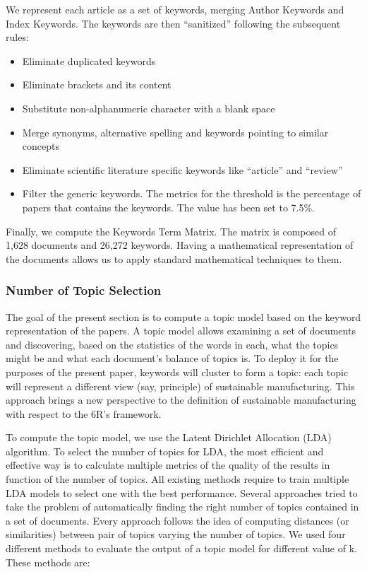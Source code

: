 \documentclass[b5paper,]{book}
\providecommand{\tightlist}{%
  \setlength{\itemsep}{0pt}\setlength{\parskip}{0pt}}
\theoremstyle{definition}
\theoremstyle{definition}
\theoremstyle{definition}
\theoremstyle{remark}
\begin{document}
We represent each article as a set of keywords, merging Author Keywords
and Index Keywords. The keywords are then ``sanitized'' following the
subsequent rules:

\begin{itemize}
\tightlist
\item
  Eliminate duplicated keywords
\item
  Eliminate brackets and its content
\item
  Substitute non-alphanumeric character with a blank space
\item
  Merge synonyms, alternative spelling and keywords pointing to similar
  concepts
\item
  Eliminate scientific literature specific keywords like ``article'' and
  ``review''
\item
  Filter the generic keywords. The metrics for the threshold is the
  percentage of papers that contains the keywords. The value has been
  set to 7.5\%.
\end{itemize}

Finally, we compute the Keywords Term Matrix. The matrix is composed of
1,628 documents and 26,272 keywords. Having a mathematical
representation of the documents allows us to apply standard mathematical
techniques to them.

\subsubsection*{Number of Topic
Selection}\label{number-of-topic-selection}

The goal of the present section is to compute a topic model based on the
keyword representation of the papers. A topic model allows examining a
set of documents and discovering, based on the statistics of the words
in each, what the topics might be and what each document's balance of
topics is. To deploy it for the purposes of the present paper, keywords
will cluster to form a topic: each topic will represent a different view
(say, principle) of sustainable manufacturing. This approach brings a
new perspective to the definition of sustainable manufacturing with
respect to the 6R's framework.

To compute the topic model, we use the Latent Dirichlet Allocation (LDA)
algorithm. To select the number of topics for LDA, the most efficient
and effective way is to calculate multiple metrics of the quality of the
results in function of the number of topics. All existing methods
require to train multiple LDA models to select one with the best
performance. Several approaches tried to take the problem of
automatically finding the right number of topics contained in a set of
documents. Every approach follows the idea of computing distances (or
similarities) between pair of topics varying the number of topics. We
used four different methods to evaluate the output of a topic model for
different value of k. These methods are:
\end{document}
